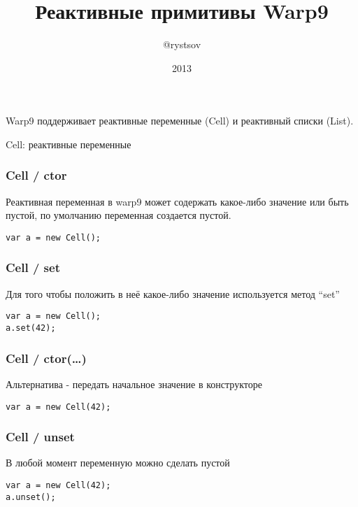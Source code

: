 \documentclass[xetex]{beamer}
\title{Реактивные примитивы Warp9}
\author{@rystsov}
\date{2013}
\begin{document}
\maketitle
\centering

\begin{frame}
    Warp9 поддерживает реактивные переменные (Cell) и реактивный списки (List).
\end{frame}


\begin{frame}
    Cell: реактивные переменные
\end{frame}


\begin{frame}[fragile]
    \frametitle{Cell / ctor}
    Реактивная переменная в warp9 может содержать какое-либо значение или быть пустой, по умолчанию переменная создается пустой.

\vspace{10mm}

\begin{lstlisting}
var a = new Cell();
\end{lstlisting}
\end{frame}


\begin{frame}[fragile]
    \frametitle{Cell / set}
    Для того чтобы положить в неё какое-либо значение используется метод “set”

\vspace{10mm}

\begin{lstlisting}
var a = new Cell();
a.set(42);
\end{lstlisting}
\end{frame}


\begin{frame}[fragile]
\frametitle{Cell / ctor(\dots)}
Альтернатива - передать начальное значение в конструкторе

\vspace{10mm}

\begin{lstlisting}
var a = new Cell(42);
\end{lstlisting}
\end{frame}


\begin{frame}[fragile]
\frametitle{Cell / unset}
В любой момент переменную можно сделать пустой

\vspace{10mm}

\begin{lstlisting}
var a = new Cell(42);
a.unset();
\end{lstlisting}
\end{frame}
\end{document}

